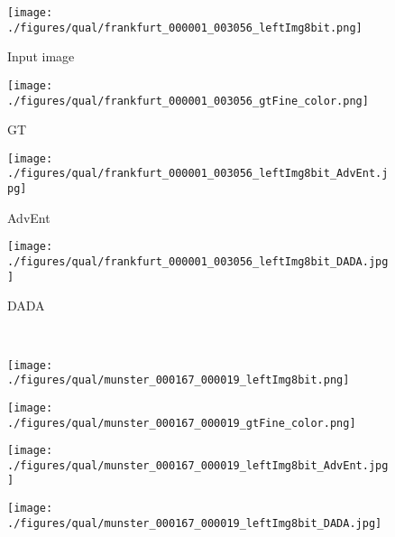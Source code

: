 \documentclass[10pt,twocolumn,letterpaper]{article}
\begin{document}
\begin{figure*}[t!]
	\begin{center}
		\begin{subfigure}[t]{0.24\textwidth}\centering
			\caption{Input image}\vspace{-0.2cm}
			\texttt{[image: ./figures/qual/frankfurt\_000001\_003056\_leftImg8bit.png]}
		\end{subfigure}
		\begin{subfigure}[t]{0.24\textwidth}\centering
			\caption{GT}\vspace{-0.2cm}
			\texttt{[image: ./figures/qual/frankfurt\_000001\_003056\_gtFine\_color.png]}
		\end{subfigure}
		\begin{subfigure}[t]{0.24\textwidth}\centering
			\caption{AdvEnt}\vspace{-0.2cm}
			\texttt{[image: ./figures/qual/frankfurt\_000001\_003056\_leftImg8bit\_AdvEnt.jpg]}
		\end{subfigure}
		\begin{subfigure}[t]{0.24\textwidth}\centering
			\caption{DADA}\vspace{-0.2cm}
			\texttt{[image: ./figures/qual/frankfurt\_000001\_003056\_leftImg8bit\_DADA.jpg]}
		\end{subfigure}\\
		\vspace{0.02cm}
		
		\hdashrule[1ex][x]{17cm}{1.5pt}{1.5mm}\vspace{-0.13cm}
		\begin{subfigure}[t]{0.24\textwidth}\centering
			\texttt{[image: ./figures/qual/munster\_000167\_000019\_leftImg8bit.png]}
		\end{subfigure}
		\begin{subfigure}[t]{0.24\textwidth}\centering
			\texttt{[image: ./figures/qual/munster\_000167\_000019\_gtFine\_color.png]}
		\end{subfigure}
		\begin{subfigure}[t]{0.24\textwidth}\centering
			\texttt{[image: ./figures/qual/munster\_000167\_000019\_leftImg8bit\_AdvEnt.jpg]}
		\end{subfigure}
		\begin{subfigure}[t]{0.24\textwidth}\centering
			\texttt{[image: ./figures/qual/munster\_000167\_000019\_leftImg8bit\_DADA.jpg]}
		\end{subfigure}\\
		\vspace{-0.16cm}
		

\end{center}
\end{figure*}
\end{document}

